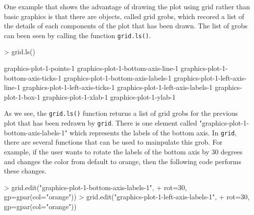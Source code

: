 \documentclass[a4paper,10pt]{article}
\begin{document}
One example that shows the advantage of drawing the plot using grid rather than basic graphics is that there are objects, called grid grobs, which recored a list of the details of each components of the plot that has been drawn. The list of grobs can been seen by calling the function \texttt{grid.ls()}. \\
\begin{Schunk}
\begin{Sinput}
> grid.ls()
\end{Sinput}
\begin{Soutput}
graphics-plot-1-points-1
graphics-plot-1-bottom-axis-line-1
graphics-plot-1-bottom-axis-ticks-1
graphics-plot-1-bottom-axis-labels-1
graphics-plot-1-left-axis-line-1
graphics-plot-1-left-axis-ticks-1
graphics-plot-1-left-axis-labels-1
graphics-plot-1-box-1
graphics-plot-1-xlab-1
graphics-plot-1-ylab-1
\end{Soutput}
\end{Schunk}


As we see, the \texttt{grid.ls()} function returns a list of grid grobs for the previous plot that has been redrawn by \texttt{grid}. There is one element called "graphics-plot-1-bottom-axis-labels-1" which represents the labels of the bottom axis. In \texttt{grid}, there are several functions that can be used to mainpulate this grob. For example, if the user wants to rotate the labels of the bottom axis by 30 degrees and changes the color from default to orange, then the following code performs these changes.\\


\begin{Schunk}
\begin{Sinput}
> grid.edit("graphics-plot-1-bottom-axis-labels-1", 
+           rot=30, gp=gpar(col="orange"))
> grid.edit("graphics-plot-1-left-axis-labels-1", 
+           rot=30, gp=gpar(col="orange"))
\end{Sinput}
\end{Schunk}
\end{document}
